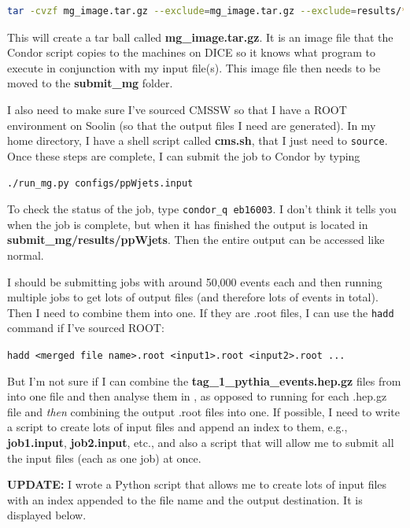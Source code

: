 \begin{lstlisting}[belowskip=-0.7cm, language=sh, numbers=none]
tar -cvzf mg_image.tar.gz --exclude=mg_image.tar.gz --exclude=results/* *
\end{lstlisting}

This will create a tar ball called \textbf{mg\_image.tar.gz}. It is an image file that the Condor script copies to the machines on DICE so it knows what program to execute in conjunction with my input file(s). This image file then needs to be moved to the \textbf{submit\_mg} folder.

I also need to make sure I've sourced CMSSW so that I have a ROOT environment on Soolin (so that the output files I need are generated). In my home directory, I have a shell script called \textbf{cms.sh}, that I just need to \verb!source!. Once these steps are complete, I can submit the job to Condor by typing

\verb!./run_mg.py configs/ppWjets.input!

To check the status of the job, type \verb!condor_q eb16003!. I don't think it tells you when the job is complete, but when it has finished the output is located in \textbf{submit\_mg/results/ppWjets}. Then the entire \madgraph output can be accessed like normal.

I should be submitting jobs with around 50,000 events each and then running multiple jobs to get lots of output files (and therefore lots of events in total). Then I need to combine them into one. If they are .root files, I can use the \verb!hadd! command if I've sourced ROOT:

\verb!hadd <merged file name>.root <input1>.root <input2>.root ...!

But I'm not sure if I can combine the \textbf{tag\_1\_pythia\_events.hep.gz} files from \madgraph into one file and then analyse them in \madanalysis, as opposed to running \madanalysis for each .hep.gz file and \emph{then} combining the output .root files into one. If possible, I need to write a script to create lots of input files and append an index to them, e.g., \textbf{job1.input}, \textbf{job2.input}, etc., and also a script that will allow me to submit all the input files (each as one job) at once.

\textbf{UPDATE:} I wrote a Python script that allows me to create lots of input files with an index appended to the file name and the \madgraph output destination. It is displayed below.

 

